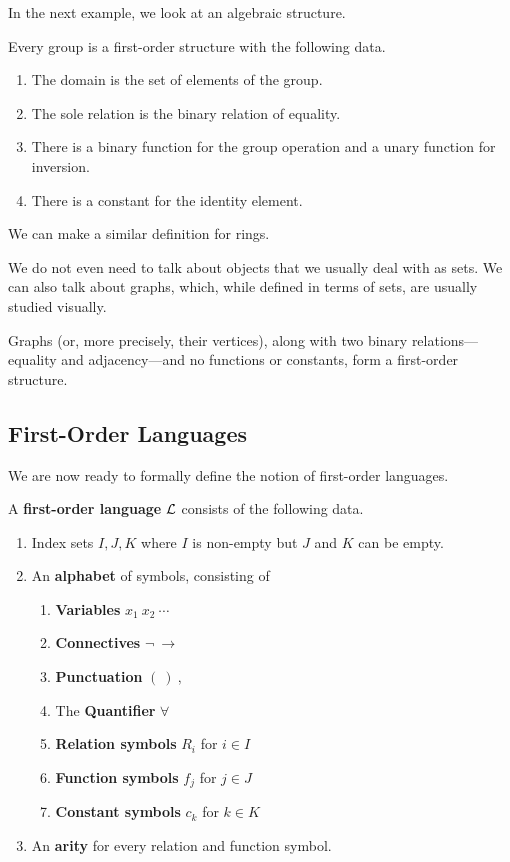 In the next example, we look at an algebraic structure.
\begin{boxexample}[Groups]
    Every group is a first-order structure with the following data.
    \begin{enumerate}
        \item The domain is the set of elements of the group.
        \item The sole relation is the binary relation of equality.
        \item There is a binary function for the group operation and a unary function for inversion.
        \item There is a constant for the identity element.
    \end{enumerate}
\end{boxexample}
We can make a similar definition for rings.

We do not even need to talk about objects that we usually deal with as sets. We can also talk about graphs, which, while defined in terms of sets, are usually studied visually.
\begin{boxexample}[Graphs]
    Graphs (or, more precisely, their vertices), along with two binary relations---equality and adjacency---and no functions or constants, form a first-order structure.
\end{boxexample}

\subsection{First-Order Languages}

We are now ready to formally define the notion of first-order languages.

\begin{boxdefinition}\label{Ch2:Def:First-Order_Language}
    A \textbf{first-order language} $\mathcal{L}$ consists of the following data.
    \begin{enumerate}
        \item Index sets $I, J, K$ where $I$ is non-empty but $J$ and $K$ can be empty.
        \item An \textbf{alphabet} of symbols, consisting of
        \begin{enumerate}[noitemsep]
            \item \textbf{Variables} $x_1 \ x_2 \ \cdots$
            \item \textbf{Connectives} $\neg \ \to$
            \item \textbf{Punctuation} $( \ ) \ ,$
            \item The \textbf{Quantifier} $\forall$
            \item \textbf{Relation symbols} $R_i$ for $i \in I$
            \item \textbf{Function symbols} $f_j$ for $j \in J$
            \item \textbf{Constant symbols} $c_k$ for $k \in K$
        \end{enumerate}
        \item An \textbf{arity} for every relation and function symbol.
    \end{enumerate}
\end{boxdefinition}

